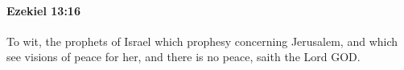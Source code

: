
		\paragraph{Ezekiel 13:16} %
			\label{EZEKIEL-13-16}

			To wit, the prophets of Israel which prophesy concerning Jerusalem, and which see visions of peace for her, and there is no peace, saith the Lord GOD.


